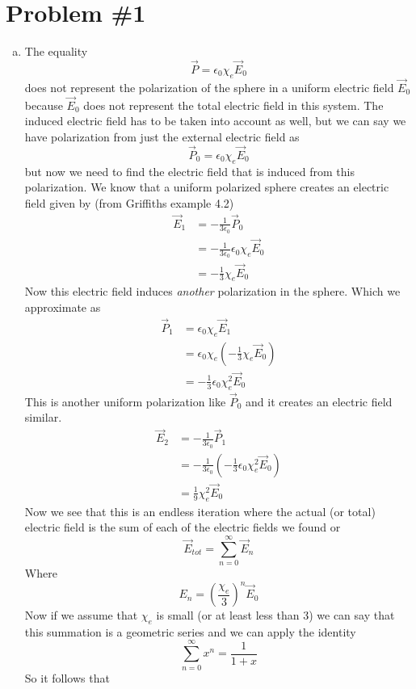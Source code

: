 \documentclass[11pt]{article}
\numberwithin{equation}{section}
\newcommand{\vecE}{\vec{E}}
\newcommand{\vecP}{\vec{P}}
\begin{document}


\section{Problem \#1}
\begin{enumerate}[(a)]
\item
The equality 
$$\vecP =\epsilon_0\chi_e\vecE_0$$
does not represent the polarization of the sphere in a uniform electric field $\vecE_0$ because $\vecE_0$ does not represent the total electric field in this system. The induced electric field has to be taken into account as well, but we can say we have polarization from just the external electric field as
$$\vecP_0 =\epsilon_0\chi_e\vecE_0$$
but now we need to find the electric field that is induced from this polarization. We know that a uniform polarized sphere creates an electric field given by (from Griffiths example 4.2)
\begin{align*}
\vecE_1 &= -\frac{1}{3\epsilon_0}\vecP_0\\
&= -\frac{1}{3\epsilon_0}\epsilon_0\chi_e\vecE_0\\
&= -\frac{1}{3}\chi_e\vecE_0
\end{align*}
Now this electric field induces \textit{another} polarization in the sphere. Which we approximate as
\begin{align*}
\vecP_1 &=\epsilon_0\chi_e\vecE_1\\
&=\epsilon_0\chi_e\left(-\frac{1}{3}\chi_e\vecE_0\right)\\
&=-\frac{1}{3}\epsilon_0\chi_e^2\vecE_0
\end{align*}
This is another uniform polarization like $\vecP_0$ and it creates an electric field similar. 
\begin{align*}
\vecE_2 &= -\frac{1}{3\epsilon_0}\vecP_1\\
&= -\frac{1}{3\epsilon_0}\left(-\frac{1}{3}\epsilon_0\chi_e^2\vecE_0\right)\\
&= \frac{1}{9}\chi_e^2\vecE_0
\end{align*}
Now we see that this is an endless iteration where the actual (or total) electric field is the sum of each of the electric fields we found or
$$\vecE_{tot} = \sum_{n=0}^{\infty}\vecE_n$$
Where
$$E_n = \left(\frac{\chi_e}{3}\right)^n\vecE_0$$
Now if we assume that $\chi_e$ is small (or at least less than 3) we can say that this summation is a geometric series and we can apply the identity
$$\sum_{n=0}^{\infty}x^n=\frac{1}{1+x}$$
So it follows that
\begin{align*}

\end{align*}
\end{enumerate}
\end{document}

